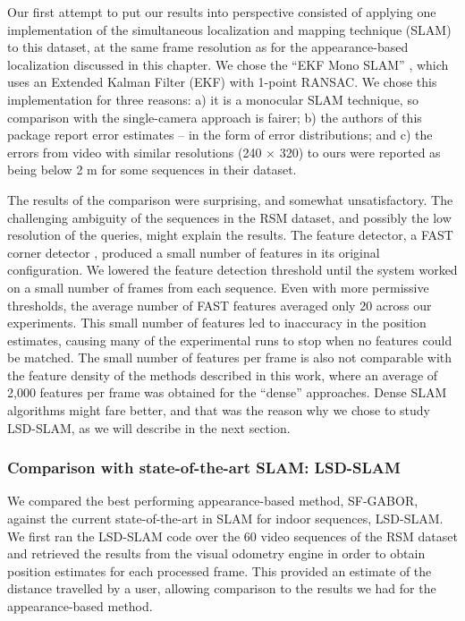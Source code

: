 Our first attempt to put our results into perspective consisted of applying one implementation of the simultaneous localization and mapping technique (SLAM) to this dataset, at the same frame resolution as for the appearance-based  localization discussed in this chapter. We chose the ``EKF Mono SLAM'' \citep{Civera}, which uses an Extended Kalman Filter (EKF) with 1-point RANSAC.  We chose this implementation for three reasons: a) it is a monocular SLAM technique, so comparison with the single-camera approach is fairer; b) the authors of this package report error estimates -- in the form of error distributions; and c) the errors from video with similar resolutions (240 $\times$ 320) to ours were reported as being below 2 m for some sequences \citep{Civera} in their dataset.

The results of the comparison were surprising, and somewhat unsatisfactory. The challenging ambiguity of the sequences in the RSM dataset, and possibly the low resolution of the queries, might explain the results. The feature detector, a FAST corner detector \citep{rosten_2006_machine}, produced a small number of features in its original  configuration. We lowered the feature detection threshold until the system worked on a small number of frames from each sequence. Even with more permissive thresholds, the average number of FAST features averaged only 20 across our experiments. This small number of features led to inaccuracy in the position estimates, causing many of the experimental runs to stop when no features could be matched. The small number of features per frame is also not comparable with the feature density of the methods described in this work, where an average of 2,000 features per frame was obtained for the ``dense'' approaches. Dense SLAM algorithms might fare better, and that was the reason why we chose to study LSD-SLAM, as we will describe in the next section.

\subsubsection{Comparison with state-of-the-art SLAM: LSD-SLAM}
\label{sec:comparisonSLAM}

We compared the best performing appearance-based method, SF-GABOR, against the current state-of-the-art in SLAM for indoor sequences, LSD-SLAM.  We first ran the LSD-SLAM code over the 60 video sequences of the RSM dataset and retrieved the results from the visual odometry engine in order to obtain position estimates for each processed frame.  This provided an estimate of the distance travelled by a user, allowing comparison to the results we had for the appearance-based method. 


